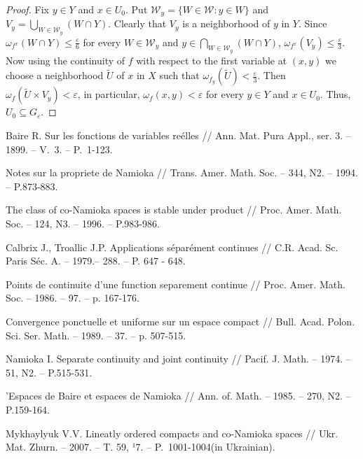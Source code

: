 \documentclass{amsart}
\begin{document}
\begin{proof}
Fix $y\in Y$ and $x\in U_0$. Put ${\mathcal W}_y=\{W\in{\mathcal W}:y\in W\}$ and $V_y=\bigcup\limits_{W\in{\mathcal W}_y}(W\cap Y)$. Clearly that $V_y$ is a neighborhood of $y$ in $Y$. Since $\omega_{f^x}(W\cap Y)\leq\frac{\varepsilon}{6}$ for every $W\in {\mathcal W}_y$ and $y\in \bigcap\limits_{W\in{\mathcal W}_y}(W\cap Y)$, $\omega_{f^x}(V_y)\leq \frac{\varepsilon}{3}$. Now using the continuity of $f$ with respect to the first variable at $(x,y)$ we choose a neighborhood $\tilde{U}$ of $x$ in $X$ such that $\omega_{f_{y}}(\tilde{U})<\frac{\varepsilon}{3}$. Then $\omega_f(\tilde{U}\times V_y)< \varepsilon$, in particular, $\omega_f(x,y)< \varepsilon$ for every $y\in Y$ and $x\in U_0$. Thus, $U_0\subseteq G_\varepsilon$.

\end{proof}


\begin{thebibliography}{10}

 {Baire R.} Sur les fonctions de variables re\'{e}lles // Ann. Mat. Pura Appl., ser. 3. -- 1899.
-- V.~3. -- P.~1-123.

 Notes sur la propriete de Namioka // Trans. Amer. Math. Soc. -- 344, N2. -- 1994. -- P.873-883.

 The class of co-Namioka spaces is stable under product // Proc. Amer. Math. Soc. -- 124, N3. -- 1996. -- P.983-986.

 {Calbrix J., Troallic J.P.} Applications s\'{e}par\'{e}ment continues // C.R. Acad. Sc. Paris S\'{e}c. A.
-- 1979.-- 288. -- P. 647 - 648.

 Points de continuite d'une function separement continue // Proc. Amer. Math. Soc. -- 1986. -- 97. -- p. 167-176.

 Convergence ponctuelle et uniforme sur un espace compact // Bull. Acad. Polon. Sci. Ser. Math. -- 1989. -- 37. -- p. 507-515.

 {Namioka I.} Separate continuity and joint continuity // Pacif. J. Math. -- 1974. -- 51, N2. -- P.515-531.

 'Espaces de Baire et espaces de Namioka // Ann. of. Math. -- 1985. -- 270, N2. -- P.159-164.

 {Mykhaylyuk V.V.} Lineatly ordered compacts and co-Namioka spaces // Ukr. Mat. Zhurn. -- 2007. -- T. 59, ¹7. -- P.~1001-1004(in Ukrainian).

\end{thebibliography}
\end{document}
